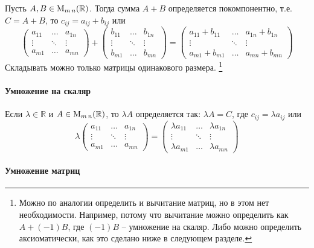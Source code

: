 Пусть $A,B\in \operatorname{M}_{m\,n}(\mathbb R)$.
Тогда сумма $A+B$ определяется покомпонентно, т.е. $C = A + B$, то $c_{ij} = a_{ij} + b_{ij}$ или
\[
\begin{pmatrix}
a_{11}&\ldots& a_{1n}\\
\vdots&\ddots&\vdots\\
a_{m1}& \ldots &a_{mn}
\end{pmatrix}
+
\begin{pmatrix}
b_{11}&\ldots& b_{1n}\\
\vdots&\ddots&\vdots\\
b_{m1}& \ldots &b_{mn}
\end{pmatrix}
=
\begin{pmatrix}
a_{11}+b_{11}&\ldots& a_{1n} + b_{1n}\\
\vdots&\ddots&\vdots\\
a_{m1}+b_{m1}& \ldots &a_{mn} + b_{mn}
\end{pmatrix}
\]
Складывать можно только матрицы одинакового размера.%
\footnote{Можно по аналогии определить и вычитание матриц, но в этом нет необходимости.
Например, потому что вычитание можно определить как $A + (-1)B$, где $(-1)B$ -- умножение на скаляр.
Либо можно определить аксиоматически, как это сделано ниже в следующем разделе.}

\paragraph{Умножение на скаляр}

Если $\lambda\in \mathbb R$ и $A\in \operatorname{M}_{m\,n}(\mathbb R)$, то $\lambda A$ определяется так: $\lambda A = C$, где $c_{ij} = \lambda a_{ij}$ или
\[
\lambda
\begin{pmatrix}
a_{11}&\ldots& a_{1n}\\
\vdots&\ddots&\vdots\\
a_{m1}& \ldots &a_{mn}
\end{pmatrix}
=
\begin{pmatrix}
\lambda a_{11}&\ldots& \lambda a_{1n}\\
\vdots&\ddots&\vdots\\
\lambda a_{m1}& \ldots &\lambda a_{mn}
\end{pmatrix}
\]

\paragraph{Умножение матриц}


